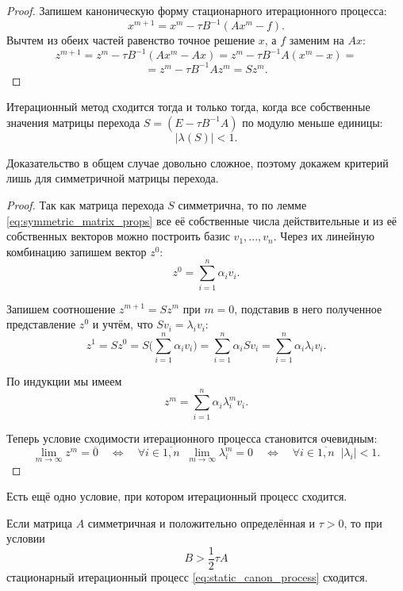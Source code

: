 \documentclass{article}
\begin{document}
\begin{proof}
	Запишем каноническую форму стационарного итерационного процесса:
	\[x^{m+1}=x^m-\tau B^{-1}(Ax^m-f).\]
	Вычтем из обеих частей равенство точное решение $x$, а $f$ заменим на
	$Ax$:
	\[z^{m+1}=z^m-\tau B^{-1}(Ax^m-Ax)=z^m-\tau B^{-1}A(x^m-x)=\]
	\[=z^m-\tau B^{-1}Az^m=Sz^m.\]
\end{proof}

\begin{theorem}
\label{eq:sle_convergence_criterion}
	Итерационный метод сходится тогда и только тогда, когда все собственные
	значения матрицы перехода $S=(E-\tau B^{-1}A)$ по модулю меньше единицы:
	\[|\lambda (S)|<1.\]
\end{theorem}

Доказательство в общем случае довольно сложное, поэтому докажем критерий лишь
для симметричной матрицы перехода.

\begin{proof}
	Так как матрица перехода $S$ симметрична, то по лемме
	\eqref{eq:symmetric_matrix_props} все её собственные числа
	действительные и из её собственных векторов можно построить базис
	$v_1,...,v_n$. Через их линейную комбинацию запишем вектор $z^0$:
	\[z^0=\sum_{i=1}^{n}\alpha_iv_i.\]

	Запишем соотношение $z^{m+1}=Sz^m$ при $m=0$, подставив в него
	полученное представление $z^0$ и учтём, что $Sv_i=\lambda_iv_i$:
	\[z^1=Sz^0=S\Big(\sum_{i=1}^{n}\alpha_iv_i\Big)=
	\sum_{i=1}^{n}\alpha_iSv_i=
	\sum_{i=1}^{n}\alpha_i\lambda_iv_i.\]

	По индукции мы имеем
	\[z^m=\sum_{i=1}^{n}\alpha_i\lambda_i^mv_i.\]

	Теперь условие сходимости итерационного процесса становится очевидным:
	\[\lim_{m\to\infty}z^m=\overline{0}\quad\Leftrightarrow\quad
	\forall i\in\overline{1,n}\;\;\lim_{m\to\infty}\lambda_i^m=0\quad
	\Leftrightarrow\quad \forall i\in\overline{1,n}\;\;|\lambda_i|<1.\]
\end{proof}

Есть ещё одно условие, при котором итерационный процесс сходится.

\begin{theorem}[Самарского]
\label{eq:samarskiy_criterion}
	Если матрица $A$ симметричная и положительно определённая и $\tau>0$,
	то при условии
	\[B>\frac{1}{2}\tau A\]
	стационарный итерационный процесс \eqref{eq:static_canon_process}
	сходится.
\end{theorem}
\end{document}
